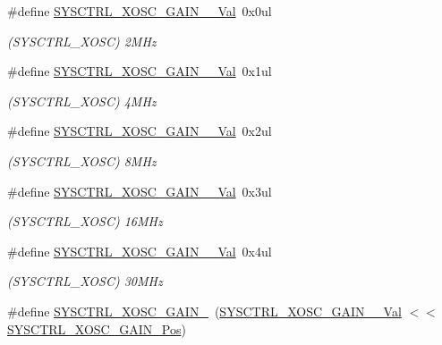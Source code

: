 \begin{DoxyCompactItemize}
\item 
\#define \mbox{\hyperlink{group___s_a_m_d21___s_y_s_c_t_r_l_ga24cd4b97753abbae208eafc474f623e6}{S\+Y\+S\+C\+T\+R\+L\+\_\+\+X\+O\+S\+C\+\_\+\+G\+A\+I\+N\+\_\+\_\+\+Val}}~0x0ul
\begin{DoxyCompactList}\small\item\em (S\+Y\+S\+C\+T\+R\+L\+\_\+\+X\+O\+SC) 2M\+Hz \end{DoxyCompactList}\item 
\#define \mbox{\hyperlink{group___s_a_m_d21___s_y_s_c_t_r_l_ga94dc4548be790afa82ef57f9a512f5d5}{S\+Y\+S\+C\+T\+R\+L\+\_\+\+X\+O\+S\+C\+\_\+\+G\+A\+I\+N\+\_\+\_\+\+Val}}~0x1ul
\begin{DoxyCompactList}\small\item\em (S\+Y\+S\+C\+T\+R\+L\+\_\+\+X\+O\+SC) 4M\+Hz \end{DoxyCompactList}\item 
\#define \mbox{\hyperlink{group___s_a_m_d21___s_y_s_c_t_r_l_gafc33a51092708e745f3ea82ec4718bd9}{S\+Y\+S\+C\+T\+R\+L\+\_\+\+X\+O\+S\+C\+\_\+\+G\+A\+I\+N\+\_\+\_\+\+Val}}~0x2ul
\begin{DoxyCompactList}\small\item\em (S\+Y\+S\+C\+T\+R\+L\+\_\+\+X\+O\+SC) 8M\+Hz \end{DoxyCompactList}\item 
\#define \mbox{\hyperlink{group___s_a_m_d21___s_y_s_c_t_r_l_ga864c2d906b0fcaa10184b5e1db20e3d3}{S\+Y\+S\+C\+T\+R\+L\+\_\+\+X\+O\+S\+C\+\_\+\+G\+A\+I\+N\+\_\+\_\+\+Val}}~0x3ul
\begin{DoxyCompactList}\small\item\em (S\+Y\+S\+C\+T\+R\+L\+\_\+\+X\+O\+SC) 16M\+Hz \end{DoxyCompactList}\item 
\#define \mbox{\hyperlink{group___s_a_m_d21___s_y_s_c_t_r_l_gaef7cb33205c55c220d691178347f5fc7}{S\+Y\+S\+C\+T\+R\+L\+\_\+\+X\+O\+S\+C\+\_\+\+G\+A\+I\+N\+\_\+\_\+\+Val}}~0x4ul
\begin{DoxyCompactList}\small\item\em (S\+Y\+S\+C\+T\+R\+L\+\_\+\+X\+O\+SC) 30M\+Hz \end{DoxyCompactList}\item 
\#define \mbox{\hyperlink{group___s_a_m_d21___s_y_s_c_t_r_l_gad399c32b1afb4341722d5c200f6688c4}{S\+Y\+S\+C\+T\+R\+L\+\_\+\+X\+O\+S\+C\+\_\+\+G\+A\+I\+N\+\_}}~(\mbox{\hyperlink{group___s_a_m_d21___s_y_s_c_t_r_l_ga24cd4b97753abbae208eafc474f623e6}{S\+Y\+S\+C\+T\+R\+L\+\_\+\+X\+O\+S\+C\+\_\+\+G\+A\+I\+N\+\_\+\_\+\+Val}}       $<$$<$ \mbox{\hyperlink{group___s_a_m_d21___s_y_s_c_t_r_l_ga1914a0f3776782e7aaf6830f903ce3af}{S\+Y\+S\+C\+T\+R\+L\+\_\+\+X\+O\+S\+C\+\_\+\+G\+A\+I\+N\+\_\+\+Pos}})
$$
\end{DoxyCompactItemize}
